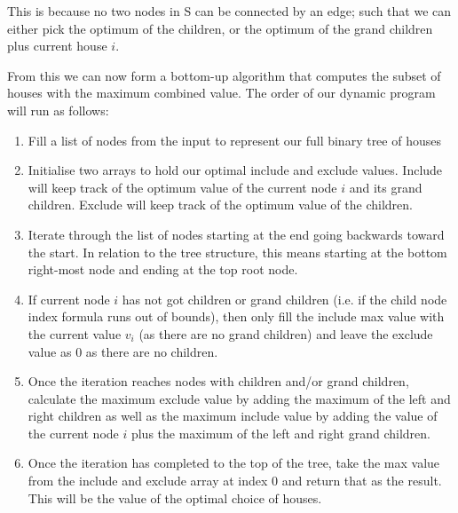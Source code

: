 \documentclass[11pt, oneside]{article}   	%
\begin{document}
\begin{enumerate}
\begin{enumerate}
		This is because no two nodes in S can be connected by an edge; such that we can either pick the optimum of the children, or the optimum of the grand children plus current house $i$.
		
		From this we can now form a bottom-up algorithm that computes the subset of houses with the maximum combined value. The order of our dynamic program will run as follows:
		\begin{enumerate}
			\item Fill a list of nodes from the input to represent our full binary tree of houses
			\item Initialise two arrays to hold our optimal include and exclude values. Include will keep track of the optimum value of the current node $i$ and its grand children. Exclude will keep track of the optimum value of the children.
			\item Iterate through the list of nodes starting at the end going backwards toward the start. In relation to the tree structure, this means starting at the bottom right-most node and ending at the top root node. 
			\item If current node $i$ has not got children or grand children (i.e. if the child node index formula runs out of bounds), then only fill the include max value with the current value $v_i$ (as there are no grand children) and leave the exclude value as 0 as there are no children.
			\item Once the iteration reaches nodes with children and/or grand children, calculate the maximum exclude value by adding the maximum of the left and right children as well as the maximum include value by adding the value of the current node $i$ plus the maximum of the left and right grand children.
			\item Once the iteration has completed to the top of the tree, take the max value from the include and exclude array at index 0 and return that as the result. This will be the value of the optimal choice of houses.
		\end{enumerate}
		

\end{enumerate}
\end{enumerate}
\end{document}
